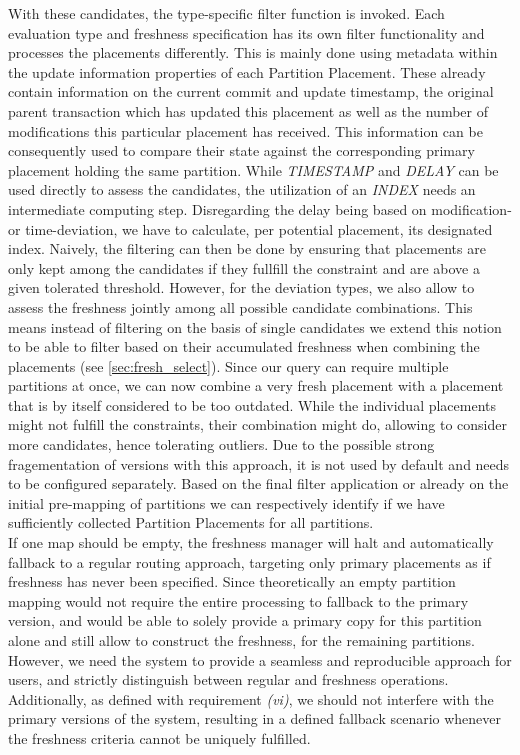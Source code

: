With these candidates, the type-specific filter function is invoked. Each evaluation type and freshness specification has its own filter functionality and
processes the placements differently. This is mainly done using metadata within the update information properties of each Partition Placement. 
These already contain information on the current commit and update timestamp,
the original parent transaction which has updated this placement as well as the number of modifications this particular placement has received.
This information can be consequently used to compare their state against the corresponding primary placement holding the same partition. 
While \emph{TIMESTAMP} and \emph{DELAY} can be used directly to assess the candidates, the utilization of an \emph{INDEX} needs an intermediate computing step.
Disregarding the delay being based on modification- or time-deviation, we have to calculate, per potential placement, its designated index.
Naively, the filtering can then be done by ensuring that placements are only kept among the candidates if they fullfill the constraint and are above 
a given tolerated threshold. However, for the deviation types, we also allow to assess the freshness jointly among all possible candidate combinations.
This means instead of filtering on the basis of single candidates we extend this notion to be able to filter based on their accumulated freshness when combining the placements
(see \ref{sec:fresh_select}).
Since our query can require multiple partitions at once, we can now combine a very fresh placement with a placement that is by itself considered to be too outdated.
While the individual placements might not fulfill the constraints, their combination might do, allowing to consider more candidates, hence tolerating outliers.
Due to the possible strong fragementation of versions with this approach, it is not used by default and needs to be configured separately.
Based on the final filter application or already on the initial pre-mapping of partitions we can respectively identify if we have sufficiently collected Partition Placements 
for all partitions.\\
If one map should be empty, the freshness manager will halt and automatically fallback to a regular routing approach, targeting only primary placements 
as if freshness has never been specified.
Since theoretically an empty partition mapping would not require the entire processing to fallback to the primary version, and 
would be able to solely provide a primary copy for this partition alone and still allow to construct the freshness, 
for the remaining partitions. 
However, we need the system to provide a seamless and reproducible approach for users, and strictly distinguish between regular and freshness operations. 
Additionally, as defined with requirement \textit{(vi)}, we should not interfere with the primary versions of the system, resulting in a defined fallback scenario whenever the freshness
criteria cannot be uniquely fulfilled.



